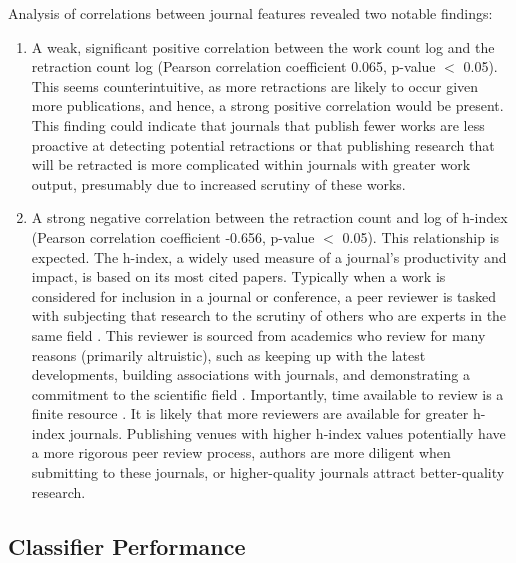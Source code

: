 \documentclass[pdflatex,sn-mathphys-num]{sn-jnl}%
\begin{document}


Analysis of correlations between journal features revealed two notable findings:
\begin{enumerate}
    \item A weak, significant positive correlation between the work count log and the retraction count log (Pearson correlation coefficient 0.065, p-value \(<\) 0.05). This seems counterintuitive, as more retractions are likely to occur given more publications, and hence, a strong positive correlation would be present. This finding could indicate that journals that publish fewer works are less proactive at detecting potential retractions or that publishing research that will be retracted is more complicated within journals with greater work output, presumably due to increased scrutiny of these works. 
    
    \item A strong negative correlation between the retraction count and log of h-index (Pearson correlation coefficient -0.656, p-value \(<\) 0.05). This relationship is expected. The h-index, a widely used measure of a journal's productivity and impact, is based on its most cited papers. Typically when a work is considered for inclusion in a journal or conference, a peer reviewer is tasked with subjecting that research to the scrutiny of others who are experts in the same field \cite{banks_thoughts_2018}. This reviewer is sourced from academics who review for many reasons (primarily altruistic), such as keeping up with the latest developments, building associations with journals, and demonstrating a commitment to the scientific field \cite{steer_peer_2021}. Importantly, time available to review is a finite resource \cite{warne_rewarding_2016}. It is likely that more reviewers are available for greater h-index journals. Publishing venues with higher h-index values potentially have a more rigorous peer review process, authors are more diligent when submitting to these journals, or higher-quality journals attract better-quality research.

\end{enumerate}

\subsection{Classifier Performance}
\end{document}
